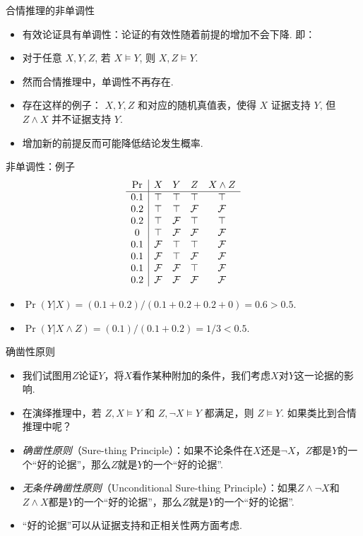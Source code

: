 \begin{frame}{合情推理的非单调性}
\begin{itemize}
    \item 有效论证具有单调性：论证的有效性随着前提的增加不会下降. 即：
    \item    
    对于任意 $X, Y, Z$, 若 $X\models Y$, 则 $X,Z\models Y$. 
    \item 然而合情推理中，单调性不再存在.
    \item 存在这样的例子： $X, Y, Z$ 和对应的随机真值表，使得 $X$ 证据支持 $Y$, 但 $Z\wedge X$ 并不证据支持 $Y$.
    \item 增加新的前提反而可能降低结论发生概率.
\end{itemize}
\end{frame}

\begin{frame}{非单调性：例子}
    \[\begin{array}{c|ccccc}
         \Pr & X & Y & Z & X \wedge Z \\ \hline
         0.1 & \top & \top & \top & \top\\
         0.2 & \top & \top & \mathcal{F} & \mathcal{F}\\
         0.2 & \top & \mathcal{F} & \top & \top\\
         0 & \top & \mathcal{F} & \mathcal{F} & \mathcal{F}\\ 
         0.1 & \mathcal{F} & \top & \top & \mathcal{F}\\ 
         0.1 & \mathcal{F} & \top & \mathcal{F} & \mathcal{F}\\
         0.1 & \mathcal{F} & \mathcal{F} & \top & \mathcal{F}\\
         0.2 & \mathcal{F} & \mathcal{F} & \mathcal{F} & \mathcal{F}\\
    \end{array}\]
    \begin{itemize}
        \item $\Pr(Y|X) = (0.1 + 0.2) / (0.1 + 0.2 + 0.2 + 0) = 0.6 > 0.5$.
        \item $\Pr(Y|X \wedge Z) = (0.1) / (0.1 + 0.2) = 1/3 < 0.5$.
    \end{itemize}
       
\end{frame}

\begin{frame}{确凿性原则}
\begin{itemize}
    \item 我们试图用$Z$论证$Y$，将$X$看作某种附加的条件，我们考虑$X$对$Y$这一论据的影响.
    \item  在演绎推理中，若 $Z,X\models Y$ 和 $Z,\lnot X\models Y$ 都满足，则 $Z\models Y$. 如果类比到合情推理中呢？
    \item \emph{确凿性原则}（Sure-thing Principle）：如果不论条件在$X$还是$\neg X$，$Z$都是$Y$的一个``好的论据''，那么$Z$就是$Y$的一个``好的论据''.
    \item \emph{无条件确凿性原则}（Unconditional Sure-thing Principle）：如果$Z\wedge\neg X$和$Z\wedge X$都是$Y$的一个``好的论据''，那么$Z$就是$Y$的一个``好的论据''.
    \item  ``好的论据''可以从证据支持和正相关性两方面考虑.
\end{itemize}
\end{frame}

